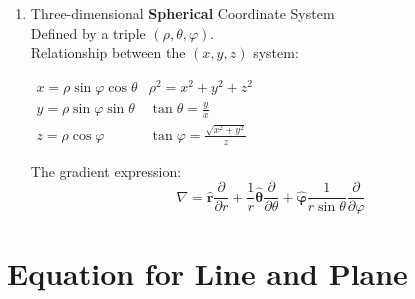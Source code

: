\documentclass[UTF8,a4paper, 10pt, openany]{book}
\begin{document}
\begin{enumerate}
\item Three-dimensional \textbf{Spherical} Coordinate System
\\Defined by a triple $(\rho, \theta, \varphi)$.
\\Relationship between the $(x, y, z)$ system:
\begin{center}
$\begin{array}{cc}
x = \rho \sin \varphi \cos \theta &  \rho ^2 = x^2+y^2+z^2\\
y = \rho \sin \varphi \sin \theta &  \tan \theta = \frac{y}{x}\\
z = \rho \cos \varphi  &  \tan \varphi = \frac{\sqrt{x^2+y^2}}{z}
\end{array}$
\end{center}
The gradient expression:
\begin{equation}
 \boxed{\nabla = \mathbf{\hat{r}}\dfrac{\partial }{\partial r}+\dfrac{1}{r}\mathbf{\hat{\theta}}\dfrac{\partial }{\partial \theta}+\mathbf{\hat{\varphi}}\dfrac{1}{r\sin \theta}\dfrac{\partial }{\partial \varphi}}
\end{equation}
\end{enumerate}

\section{Equation for Line and Plane}
\end{document}
